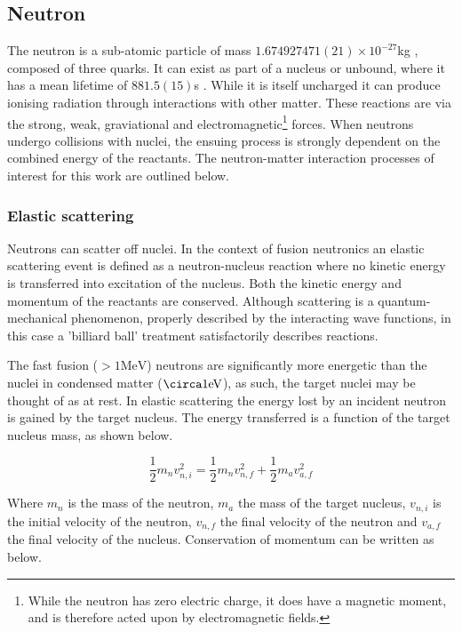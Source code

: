 \subsection{Neutron}
The neutron is a sub-atomic particle of mass $1.674927471(21)\times10^{-27}$kg \cite{}, composed of three quarks. It can exist as part of a nucleus or unbound, where it has a mean lifetime of $881.5(15)$s \cite{}. While it is itself uncharged it can produce ionising radiation through interactions with other matter. These reactions are via the strong, weak, graviational and electromagnetic\footnote{While the neutron has zero electric charge, it does have a magnetic moment, and is therefore acted upon by electromagnetic fields.} forces. When neutrons undergo collisions with nuclei, the ensuing process is strongly dependent on the combined energy of the reactants. The neutron-matter interaction processes of interest for this work are outlined below.

\subsubsection{Elastic scattering}
Neutrons can scatter off nuclei. In the context of fusion neutronics an elastic scattering event is defined as a neutron-nucleus reaction where no kinetic energy is transferred into excitation of the nucleus. Both the kinetic energy and momentum of the reactants are conserved. Although scattering is a quantum-mechanical phenomenon, properly described by the interacting wave functions, in this case a 'billiard ball' treatment satisfactorily describes reactions. 

The fast fusion ($> 1 \mathrm{MeV}$) neutrons are significantly more energetic than the nuclei in condensed matter ($\circa 1 \mathrm{eV}$), as such, the target nuclei may be thought of as at rest. In elastic scattering the energy lost by an incident neutron is gained by the target nucleus. The energy transferred is a function of the target nucleus mass, as shown below.

\begin{equation}
  \frac{1}{2}m_{n}v_{n,i}^{2} = \frac{1}{2}m_{n}v_{n,f}^{2} + \frac{1}{2}m_{a}v_{a,f}^{2}
  \label{eq:conserve_energy}
\end{equation}

Where $m_{n}$ is the mass of the neutron, $m_{a}$ the mass of the target nucleus, $v_{n,i}$ is the initial velocity of the neutron, $v_{n,f}$ the final velocity of the neutron and $v_{a,f}$ the final velocity of the nucleus. Conservation of momentum can be written as below.

